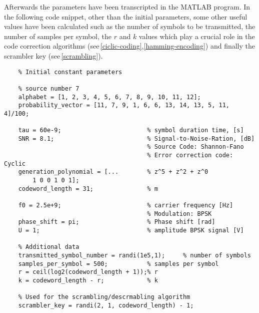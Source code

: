 \FloatBarrier\noindent Afterwards the parameters have been transcripted in the MATLAB program. In the following code snippet, other than the initial parameters, some other useful values have been calculated such as the number of symbols to be transmitted, the number of samples per symbol, the $r$ and $k$ values which play a crucial role in the code correction algorithms (see\,\ref{ciclic-coding},\ref{hamming-encoding}) and finally the scrambler key (see\,\ref{scrambling}).

\begin{lstlisting}
    % Initial constant parameters

    % source number 7
    alphabet = [1, 2, 3, 4, 5, 6, 7, 8, 9, 10, 11, 12];
    probability_vector = [11, 7, 9, 1, 6, 6, 13, 14, 13, 5, 11, 4]/100;
    
    tau = 60e-9;                        % symbol duration time, [s]
    SNR = 8.1;                          % Signal-to-Noise-Ration, [dB]
                                        % Source Code: Shannon-Fano
                                        % Error correction code: Cyclic
    generation_polynomial = [...        % z^5 + z^2 + z^0
        1 0 0 1 0 1]; 
    codeword_length = 31;               % m
    
    f0 = 2.5e+9;                        % carrier frequency [Hz]
                                        % Modulation: BPSK
    phase_shift = pi;                   % Phase shift [rad]
    U = 1;                              % amplitude BPSK signal [V]
    
    % Additional data
    transmitted_symbol_number = randi(1e5,1);     % number of symbols   
    samples_per_symbol = 500;           % samples per symbol
    r = ceil(log2(codeword_length + 1));% r
    k = codeword_length - r;            % k
    
    % Used for the scrambling/descrmabling algorithm
    scrambler_key = randi(2, 1, codeword_length) - 1; 
\end{lstlisting}





\setcounter{secnumdepth}{1}


